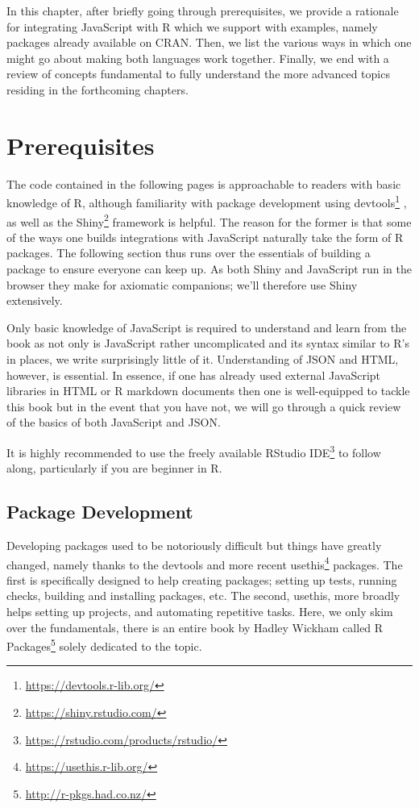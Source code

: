 \documentclass[
]{krantz}
\renewcommand{\href}[2]{#2\footnote{\url{#1}}}
\begin{document}
In this chapter, after briefly going through prerequisites, we provide a rationale for integrating JavaScript with R which we support with examples, namely packages already available on CRAN. Then, we list the various ways in which one might go about making both languages work together. Finally, we end with a review of concepts fundamental to fully understand the more advanced topics residing in the forthcoming chapters.

\hypertarget{prerequisites}{%
\section*{Prerequisites}\label{prerequisites}}


The code contained in the following pages is approachable to readers with basic knowledge of R, although familiarity with package development using \href{https://devtools.r-lib.org/}{devtools} \citep{R-devtools}, as well as the \href{https://shiny.rstudio.com/}{Shiny} \citep{R-shiny} framework is helpful. The reason for the former is that some of the ways one builds integrations with JavaScript naturally take the form of R packages. The following section thus runs over the essentials of building a package to ensure everyone can keep up. As both Shiny and JavaScript run in the browser they make for axiomatic companions; we'll therefore use Shiny extensively.

Only basic knowledge of JavaScript is required to understand and learn from the book as not only is JavaScript rather uncomplicated and its syntax similar to R's in places, we write surprisingly little of it. Understanding of JSON and HTML, however, is essential. In essence, if one has already used external JavaScript libraries in HTML or R markdown documents then one is well-equipped to tackle this book but in the event that you have not, we will go through a quick review of the basics of both JavaScript and JSON.

It is highly recommended to use the freely available \href{https://rstudio.com/products/rstudio/}{RStudio IDE} to follow along, particularly if you are beginner in R.

\hypertarget{package-development}{%
\subsection*{Package Development}\label{package-development}}


Developing packages used to be notoriously difficult but things have greatly changed, namely thanks to the devtools and more recent \href{https://usethis.r-lib.org/}{usethis} \citep{R-usethis} packages. The first is specifically designed to help creating packages; setting up tests, running checks, building and installing packages, etc. The second, usethis, more broadly helps setting up projects, and automating repetitive tasks. Here, we only skim over the fundamentals, there is an entire book by Hadley Wickham called \href{http://r-pkgs.had.co.nz/}{R Packages} solely dedicated to the topic.
\end{document}
